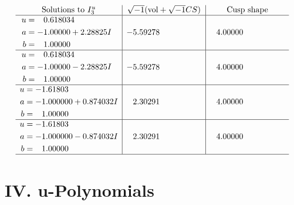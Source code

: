 \documentclass[1p]{elsarticle_modified}
\theoremstyle{definition}
\newcommand{\I}{\sqrt{-1}}
\begin{document}
$$\begin{array}{c|c|c}  
\text{Solutions to }I^u_{3}& \I (\text{vol} + \sqrt{-1}CS) & \text{Cusp shape}\\
 \hline 
\begin{aligned}
u &= \phantom{-}0.618034\phantom{ +0.000000I} \\
a &= -1.00000 + 2.28825 I \\
b &= \phantom{-}1.00000\phantom{ +0.000000I}\end{aligned}
 & -5.59278\phantom{ +0.000000I} & \phantom{-}4.00000\phantom{ +0.000000I} \\ \hline\begin{aligned}
u &= \phantom{-}0.618034\phantom{ +0.000000I} \\
a &= -1.00000 - 2.28825 I \\
b &= \phantom{-}1.00000\phantom{ +0.000000I}\end{aligned}
 & -5.59278\phantom{ +0.000000I} & \phantom{-}4.00000\phantom{ +0.000000I} \\ \hline\begin{aligned}
u &= -1.61803\phantom{ +0.000000I} \\
a &= -1.000000 + 0.874032 I \\
b &= \phantom{-}1.00000\phantom{ +0.000000I}\end{aligned}
 & \phantom{-}2.30291\phantom{ +0.000000I} & \phantom{-}4.00000\phantom{ +0.000000I} \\ \hline\begin{aligned}
u &= -1.61803\phantom{ +0.000000I} \\
a &= -1.000000 - 0.874032 I \\
b &= \phantom{-}1.00000\phantom{ +0.000000I}\end{aligned}
 & \phantom{-}2.30291\phantom{ +0.000000I} & \phantom{-}4.00000\phantom{ +0.000000I}\\
 \hline 
 \end{array}$$\newpage
\newpage\renewcommand{\arraystretch}{1}
\centering \section*{ IV. u-Polynomials}
\end{document}
